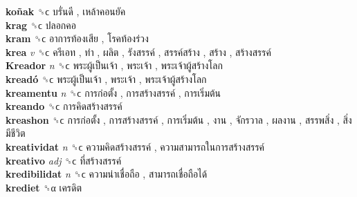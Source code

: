 \textbf{koñak} ␝ϲ   บรั่นดี ,  เหล้าคอนยัค   \\
\textbf{krag} ␝ϲ   ปลอกคอ   \\
\textbf{kram} ␝ϲ   อาการท้องเสีย ,  โรคท้องร่วง   \\
\textbf{krea} \emph{v}  ␝ϲ   ครีเอท ,  ทำ ,  ผลิต ,  รังสรรค์ ,  สรรค์สร้าง ,  สร้าง ,  สร้างสรรค์   \\
\textbf{Kreador} \emph{n}  ␝ϲ   พระผู้เป็นเจ้า ,  พระเจ้า ,  พระเจ้าผู้สร้างโลก   \\
\textbf{kreadó} ␝ϲ   พระผู้เป็นเจ้า ,  พระเจ้า ,  พระเจ้าผู้สร้างโลก   \\
\textbf{kreamentu} \emph{n}  ␝ϲ   การก่อตั้ง ,  การสร้างสรรค์ ,  การเริ่มต้น   \\
\textbf{kreando} ␝ϲ   การคิดสร้างสรรค์   \\
\textbf{kreashon} ␝ϲ   การก่อตั้ง ,  การสร้างสรรค์ ,  การเริ่มต้น ,  งาน ,  จักรวาล ,  ผลงาน ,  สรรพสิ่ง ,  สิ่งมีชีวิต   \\
\textbf{kreatividat} \emph{n}  ␝ϲ   ความคิดสร้างสรรค์ ,  ความสามารถในการสร้างสรรค์   \\
\textbf{kreativo} \emph{adj}  ␝ϲ   ที่สร้างสรรค์   \\
\textbf{kredibilidat} \emph{n}  ␝ϲ   ความน่าเชื่อถือ ,  สามารถเชื่อถือได้   \\
\textbf{krediet} ␝α   เครดิต   \\

